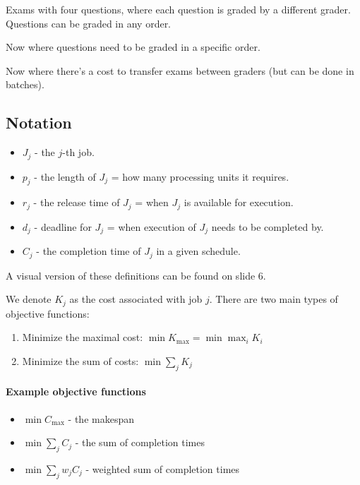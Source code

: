 \documentclass{idc_msc}
\begin{document}
Exams with four questions, where each question is graded by a different grader. Questions can be graded in any order.

Now where questions need to be graded in a specific order.

Now where there's a cost to transfer exams between graders (but can be done in batches).

\subsection{Notation}

\begin{itemize}
  \item \(J_j\) - the \(j\)-th job.
  \item \(p_j\) - the length of \(J_j\) = how many processing units it requires.
  \item \(r_j\) - the release time of \(J_j\) = when \(J_j\) is available for execution.
  \item \(d_j\) - deadline for \(J_j\) = when execution of \(J_j\) needs to be completed by.
  \item \(C_j\) - the completion time of \(J_j\) in a given schedule.
\end{itemize}

A visual version of these definitions can be found on slide 6.


We denote \(K_j\) as the cost associated with job \(j\).
There are two main types of objective functions:

\begin{enumerate}
  \item Minimize the maximal cost: \(\min K_{\max} = \min \max_i K_i\)
  \item Minimize the sum of costs: \(\min \sum_j K_j\)
\end{enumerate}

\paragraph{Example objective functions}

\begin{itemize}
  \item \(\min C_{\max}\) - the makespan
  \item \(\min \sum_j C_j\) - the sum of completion times
  \item \(\min \sum_j w_j C_j\) - weighted sum of completion times
\end{itemize}
\end{document}
